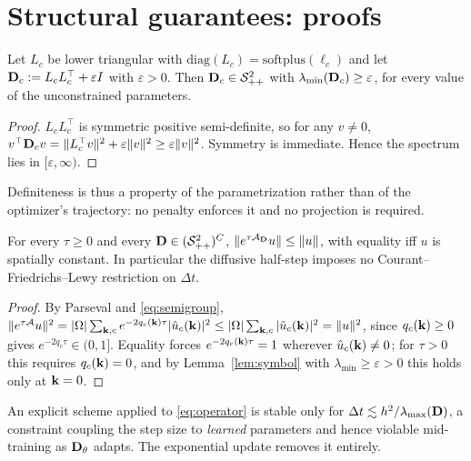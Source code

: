 \section{Structural guarantees: proofs}
\label{app:proofs}

\begin{proposition}
\label{prop:spd}
Let $L_c$ be lower triangular with $\mathrm{diag}(L_c)=\mathrm{softplus}(\ell_c)$
and let $\mathbf{D}_c := L_cL_c^\top + \varepsilon I$ with $\varepsilon>0$. Then
$\mathbf{D}_c \in \mathcal{S}_{++}^2$ with $\lambda_{\min}(\mathbf{D}_c)\ge\varepsilon$, for
every value of the unconstrained parameters.
\end{proposition}

\begin{proof}
$L_cL_c^\top$ is symmetric positive semi-definite, so for any $v\ne0$,
$v^\top \mathbf{D}_c v = \|L_c^\top v\|^2 + \varepsilon\|v\|^2 \ge \varepsilon\|v\|^2$.
Symmetry is immediate. Hence the spectrum lies in $[\varepsilon,\infty)$.
\end{proof}

Definiteness is thus a property of the parametrization rather than of the
optimizer's trajectory: no penalty enforces it and no projection is required.

\begin{proposition}
\label{prop:contraction}
For every $\tau \ge 0$ and every $\mathbf{D} \in (\mathcal{S}_{++}^2)^C$,
$\|e^{\tau\mathcal{A}_{\mathbf{D}}}u\| \le \|u\|$, with equality iff $u$ is
spatially constant. In particular the diffusive half-step imposes no
Courant--Friedrichs--Lewy restriction on $\Delta t$.
\end{proposition}

\begin{proof}
By Parseval and \eqref{eq:semigroup},
$\|e^{\tau\mathcal{A}}u\|^2 = |\Omega|\sum_{\mathbf{k},c} e^{-2q_c(\mathbf{k})\tau}
|\hat u_c(\mathbf{k})|^2 \le |\Omega|\sum_{\mathbf{k},c}|\hat u_c(\mathbf{k})|^2 = \|u\|^2$, since
$q_c(\mathbf{k})\ge0$ gives $e^{-2q_c\tau}\in(0,1]$. Equality forces
$e^{-2q_c(\mathbf{k})\tau}=1$ wherever $\hat u_c(\mathbf{k})\ne0$; for $\tau>0$ this requires
$q_c(\mathbf{k})=0$, and by Lemma~\ref{lem:symbol} with $\lambda_{\min}\ge\varepsilon>0$
this holds only at $\mathbf{k}=0$.
\end{proof}

An explicit scheme applied to \eqref{eq:operator} is stable only for
$\Delta t \lesssim h^2/\lambda_{\max}(\mathbf{D})$, a constraint coupling the step size
to \emph{learned} parameters and hence violable mid-training as $\mathbf{D}_\theta$
adapts. The exponential update removes it entirely.

